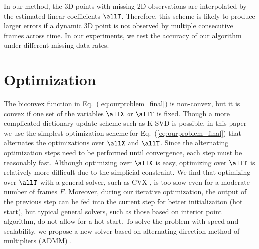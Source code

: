 In our method, the 3D points with missing 2D observations are interpolated by the estimated linear coefficients $\allT$. Therefore, this scheme is likely to produce larger errors if a dynamic 3D point is not observed by multiple consecutive frames across time. In our experiments, we test the accuracy of our algorithm under different missing-data rates.




\section{Optimization}\label{sec:solver}

The biconvex function in Eq.~(\ref{eq:ourproblem_final}) is non-convex, but it is convex if one set of the variables $\allX$ or $\allT$ is fixed.
Though a  more complicated dictionary update scheme such as K-SVD \cite{aharon2006img} is possible,
in this paper we use the simplest optimization scheme for Eq.~(\ref{eq:ourproblem_final}) that alternates the optimizations over $\allX$ and $\allT$.
Since the alternating optimization steps need to be performed until convergence, each step must be reasonably fast.
Although optimizing over $\allX$ is easy, optimizing over $\allT$ is relatively more difficult due to the simplicial constraint.
We find that optimizing over $\allT$ with a general solver, such as CVX \cite{cvx}, is too slow even for a moderate number of frames $F$.
Moreover, during our iterative optimization, the output of the previous step can be fed into the current step for better initializaiton (hot start), but typical general solvers, such as those based on interior point algorithm, do not allow for a hot start.
To solve the problem with speed and scalability, we propose a new solver based on alternating direction method of multipliers (ADMM) \cite{boyd2011distributed}.


